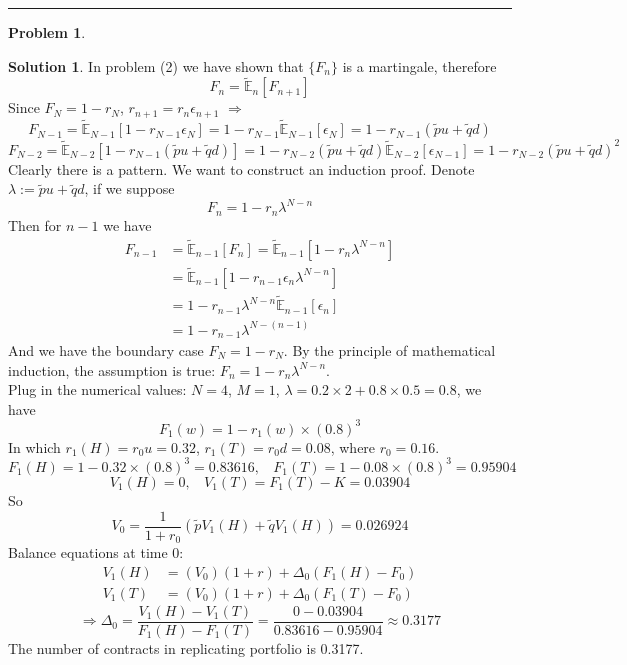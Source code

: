 \documentclass[a4paper, 10pt]{article}
\theoremstyle{definition}
\newtheorem{problem}{Problem}
\theoremstyle{hSol}
\newtheorem*{solution}{Solution}
\begin{document}
\noindent\rule{16cm}{0.4pt}
\begin{problem} 
\end{problem}
\begin{solution} In problem (2) we have shown that $\{F_n\}$ is a martingale, therefore
\begin{equation}
  F_n = \tilde{\mathbb{E}}_n\left[F_{n+1}\right]
\end{equation}
Since $F_N = 1-r_N$, $r_{n+1} = r_n \epsilon_{n+1}$ $\Rightarrow$
$$
F_{N-1} = \tilde{\mathbb{E}}_{N-1}\left[1-r_{N-1} \epsilon_{N}\right] = 1-r_{N-1} \tilde{\mathbb{E}}_{N-1}\left[\epsilon_{N}\right] = 1-r_{N-1}(\tilde{p}u+\tilde{q}d)
$$
$$
F_{N-2} = \tilde{\mathbb{E}}_{N-2}\left[1-r_{N-1}(\tilde{p}u+\tilde{q}d)\right] = 1-r_{N-2}(\tilde{p}u+\tilde{q}d) \tilde{\mathbb{E}}_{N-2}\left[\epsilon_{N-1}\right] = 1-r_{N-2}(\tilde{p}u+\tilde{q}d)^2
$$
Clearly there is a pattern. We want to construct an induction proof. Denote $\lambda:=\tilde{p}u+\tilde{q}d$, if we suppose 
$$
F_{n} = 1-r_{n}\lambda^{N-n}
$$
Then for $n-1$ we have
\begin{equation}
  \begin{split}
    F_{n-1} &= \tilde{\mathbb{E}}_{n-1}\left[F_{n}\right] = \tilde{\mathbb{E}}_{n-1}\left[1-r_{n}\lambda^{N-n}\right] \\
    &= \tilde{\mathbb{E}}_{n-1}\left[1-r_{n-1}\epsilon_n\lambda^{N-n}\right] \\
    &= 1-r_{n-1}\lambda^{N-n}\tilde{\mathbb{E}}_{n-1}\left[\epsilon_n\right] \\
    &= 1-r_{n-1}\lambda^{N-(n-1)}
  \end{split}
\end{equation}
And we have the boundary case $F_N = 1-r_N$. By the principle of mathematical induction, the assumption is true: $F_{n} = 1-r_{n}\lambda^{N-n}$.\\
Plug in the numerical values: $N=4$, $M=1$, $\lambda=0.2\times 2 + 0.8\times 0.5 = 0.8$, we have
$$
F_1(w) = 1-r_1(w)\times (0.8)^{3}
$$
In which $r_1(H)=r_0 u = 0.32$, $r_1(T)=r_0d = 0.08$, where $r_0=0.16$.
$$
F_1(H) = 1-0.32\times(0.8)^3 = 0.83616,~~~~F_1(T) = 1-0.08\times(0.8)^3 = 0.95904
$$
$$
V_1(H) = 0,~~~~V_1(T)=F_1(T)-K = 0.03904
$$
So
$$
V_0 = \frac{1}{1+r_0}(\tilde{p}V_1(H)+\tilde{q}V_1(H)) = 0.026924
$$
Balance equations at time $0$:
\begin{equation}
  \begin{split}
    V_1(H) &= (V_0)(1+r) + \Delta_0(F_1(H) - F_0)\\
    V_1(T) &= (V_0)(1+r) + \Delta_0(F_1(T) - F_0)
  \end{split}
\end{equation}
\begin{equation}
  \Rightarrow \Delta_0 = \frac{V_1(H)-V_1(T)}{F_1(H)-F_1(T)} = \frac{0-0.03904}{0.83616-0.95904} \approx 0.3177
\end{equation}
The number of contracts in replicating portfolio is 0.3177.
\end{solution}
\end{document}
